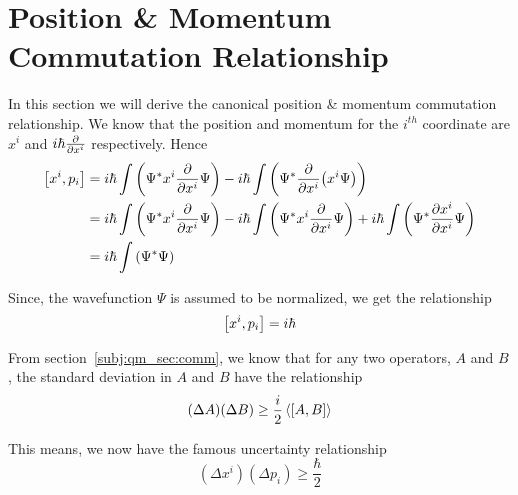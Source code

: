 \section{Position \& Momentum Commutation Relationship}{\label{subj:qm_sec:unc}}

In this section we will derive the canonical position \& momentum
commutation relationship. We know that the position and momentum for the $i^{th}$ coordinate are $x^i$ and $i\hbar\pdv{x^i}$ respectively. Hence
\begin{equation*}
  \begin{split}
    \commutator{x^i}{p_i} & = i\hbar\int \left(  \Psi^* x^i \pdv{x^i} \Psi \right) - i\hbar\int \left(  \Psi^* \pdv{x^i}(x^i \Psi) \right) \\
    & = i\hbar\int \left(  \Psi^* x^i \pdv{x^i} \Psi \right) - i\hbar\int \left(  \Psi^* x^i \pdv{x^i} \Psi \right) + i\hbar\int \left(  \Psi^* \pdv{x^i}{x^i} \Psi \right) \\
    & = i\hbar\int \left(\Psi^*\Psi\right)
  \end{split}
\end{equation*}

Since, the wavefunction $\Psi$ is assumed to be normalized, we get the
relationship
\[
\commutator{x^i}{p_i} = i\hbar
\]

From section~\ref{subj:qm_sec:comm}, we know that for any two
operators, $A$ and $B$, the standard deviation in $A$ and $B$ have the
relationship
\[
    (\Delta A)(\Delta B) \ge \frac{i}{2}\expval{\commutator{A}{B}}
\]

This means, we now have the famous uncertainty relationship
\[
(\Delta x^i)(\Delta p_i) \ge \frac{\hbar}{2}
\]
